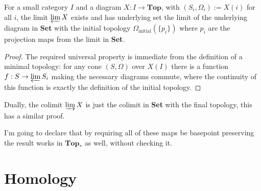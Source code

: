 \documentclass[a4paper]{article}
\begin{document}
\begin{proposition}
    For a small category $I$ and a diagram $X:I\rightarrow \textbf{Top}$, with $(S_i,\Omega_i):= X(i)$ for all $i$, the limit $\varprojlim X$ exists and has underlying set the limit of the underlying diagram in \textbf{Set} with the initial topology $\Omega_{\text{initial}}(\{p_i\})$ where $p_i$ are the projection maps from the limit in \textbf{Set}.
    \begin{proof}
        The required universal property is immediate from the definition of a minimal topology: for any cone $(S,\Omega)$ over $X(I)$ there is a function $f:S\rightarrow \varprojlim S_i$ making the necessary diagrams commute, where the continuity of this function is exactly the definition of the initial topology.
    \end{proof}
    Dually, the colimit $\varinjlim X$ is just the colimit in \textbf{Set} with the final topology, this has a similar proof.
\end{proposition}
I'm going to declare that by requiring all of these maps be basepoint preserving the result works in $\textbf{Top}_*$ as well, without checking it.










\section{Homology}



\end{document}
